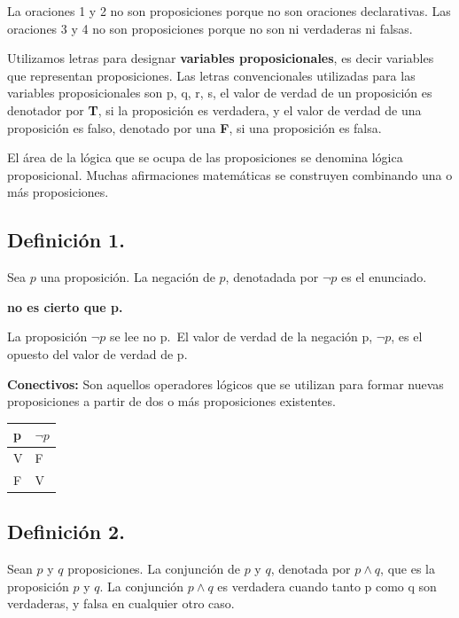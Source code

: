 \documentclass[
  letterpaper,
  DIV=11,
  numbers=noendperiod]{scrartcl}
\begin{document}
La oraciones 1 y 2 no son proposiciones porque no son oraciones
declarativas. Las oraciones 3 y 4 no son proposiciones porque no son ni
verdaderas ni falsas.

Utilizamos letras para designar \textbf{variables proposicionales}, es
decir variables que representan proposiciones. Las letras convencionales
utilizadas para las variables proposicionales son p, q, r, s, el valor
de verdad de un proposición es denotador por \textbf{T}, si la
proposición es verdadera, y el valor de verdad de una proposición es
falso, denotado por una \textbf{F}, si una proposición es falsa.

El área de la lógica que se ocupa de las proposiciones se denomina
lógica proposicional. Muchas afirmaciones matemáticas se construyen
combinando una o más proposiciones.

\subsection{Definición 1.}\label{definiciuxf3n-1.}

Sea \(p\) una proposición. La negación de \(p\), denotadada por
\(\neg p\) es el enunciado.

\textbf{no es cierto que p.}

La proposición \(\neg p\) se lee no p.~El valor de verdad de la negación
p, \(\neg p\), es el opuesto del valor de verdad de p.

\textbf{Conectivos:} Son aquellos operadores lógicos que se utilizan
para formar nuevas proposiciones a partir de dos o más proposiciones
existentes.

\begin{longtable}[]{@{}ll@{}}
\toprule\noalign{}
p & \(\neg p\) \\
\midrule\noalign{}
\endhead
\bottomrule\noalign{}
\endlastfoot
V & F \\
F & V \\
\end{longtable}

\subsection{Definición 2.}\label{definiciuxf3n-2.}

Sean \(p\) y \(q\) proposiciones. La conjunción de \(p\) y \(q\),
denotada por \(p \land q\), que es la proposición \(p\) y \(q\). La
conjunción \(p \land q\) es verdadera cuando tanto p como q son
verdaderas, y falsa en cualquier otro caso.
\end{document}
